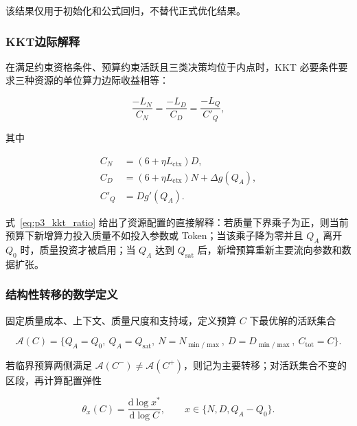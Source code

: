 该结果仅用于初始化和公式回归，不替代正式优化结果。

\subsubsection{KKT边际解释}

在满足约束资格条件、预算约束活跃且三类决策均位于内点时，KKT 必要条件要求三种资源的单位算力边际收益相等\cite{nocedal2006numerical}：

\begin{equation}
\frac{-L_N}{C_N}
=\frac{-L_D}{C_D}
=\frac{-L_Q}{C'_Q},
\label{eq:p3_kkt_ratio}
\end{equation}

其中

\begin{equation}
\begin{aligned}
C_N&=(6+\eta L_{\mathrm{ctx}})D,\\
C_D&=(6+\eta L_{\mathrm{ctx}})N+\Delta g(Q_A),\\
C'_Q&=Dg'(Q_A).
\end{aligned}
\label{eq:p3_marginal_costs}
\end{equation}

式~\eqref{eq:p3_kkt_ratio} 给出了资源配置的直接解释：若质量下界乘子为正，则当前预算下新增算力投入质量不如投入参数或 Token；当该乘子降为零并且 $Q_A$ 离开 $Q_0$ 时，质量投资才被启用；当 $Q_A$ 达到 $Q_{\mathrm{sat}}$ 后，新增预算重新主要流向参数和数据扩张。

\subsubsection{结构性转移的数学定义}

固定质量成本、上下文、质量尺度和支持域，定义预算 $C$ 下最优解的活跃集合

\begin{equation}
\mathcal A(C)=
\{Q_A=Q_0,\ Q_A=Q_{\mathrm{sat}},\
N=N_{\min/\max},\ D=D_{\min/\max},\
C_{\mathrm{tot}}=C\}.
\label{eq:p3_active_set}
\end{equation}

若临界预算两侧满足 $\mathcal A(C^-)\neq\mathcal A(C^+)$，则记为主要转移；对活跃集合不变的区段，再计算配置弹性

\begin{equation}
\theta_x(C)=\frac{\mathrm d\log x^*}{\mathrm d\log C},
\qquad x\in\{N,D,Q_A-Q_0\}.
\label{eq:p3_configuration_elasticity}
\end{equation}

